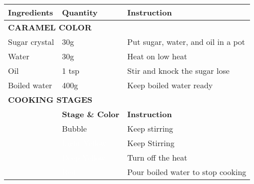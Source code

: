 \documentclass{article}
\newcommand{\tabletitle}[1]{\midrule\multicolumn{3}{l}{\textbf{\color{BrickRed} \MakeUppercase{#1}}}}
\begin{document}
\begin{tabular}{lll} \toprule
    \textbf{Ingredients} & \textbf{Quantity}                                  & \textbf{Instruction}               \\
    \tabletitle{Caramel Color}                                                                                     \\
    Sugar crystal        & 30g                                                & Put sugar, water, and oil in a pot \\
    Water                & 30g                                                & Heat on low heat                   \\
    Oil                  & 1 tsp                                              & Stir and knock the sugar lose      \\
    Boiled water         & 400g                                               & Keep boiled water ready            \\
    \tabletitle{Cooking Stages}                                                                                    \\
                         & \textbf{Stage \& Color}                            & \textbf{Instruction}               \\
                         & \cellcolor{stage_1}Bubble                          & Keep stirring                      \\
                         & \cellcolor{stage_2}\textcolor{White}{Light Yellow} & Keep Stirring                      \\
                         & \cellcolor{stage_3}\textcolor{White}{Deep Yellow}  & Turn off the heat                  \\
                         & \cellcolor{stage_4}\textcolor{White}{Red}          & Pour boiled water to stop cooking  \\
    \bottomrule
\end{tabular}
\end{document}
